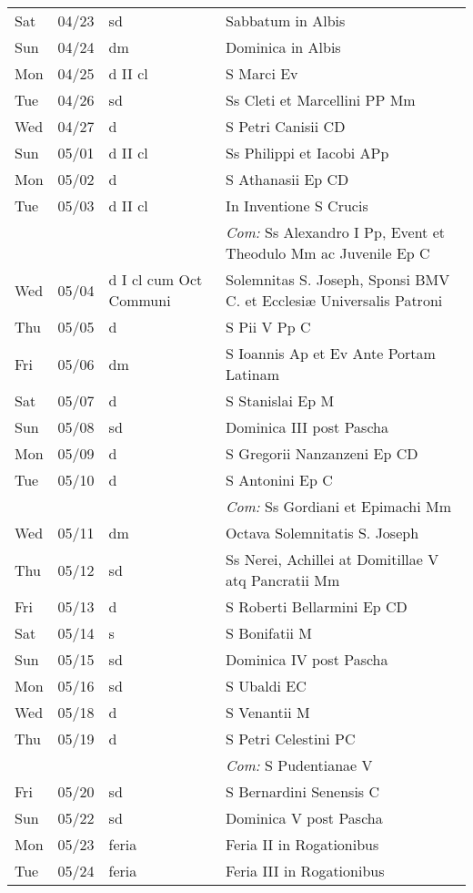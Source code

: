 \documentclass[10pt]{article}
\begin{document}
\begin{longtable}{ l l l l }
Sat & 04/23 & sd & Sabbatum in Albis\\
Sun & 04/24 & dm & Dominica in Albis\\
Mon & 04/25 & d II cl & S Marci Ev\\
Tue & 04/26 & sd & Ss Cleti et Marcellini PP Mm\\
Wed & 04/27 & d & S Petri Canisii CD\\
Sun & 05/01 & d II cl & Ss Philippi et Iacobi APp\\
Mon & 05/02 & d & S Athanasii Ep CD\\
Tue & 05/03 & d II cl & In Inventione S Crucis\\
 & & & \textit{Com:} Ss Alexandro I Pp, Event et Theodulo Mm ac Juvenile Ep C\\
Wed & 05/04 & d I cl cum Oct Communi & Solemnitas S. Joseph, Sponsi BMV C. et Ecclesiæ Universalis Patroni\\
Thu & 05/05 & d & S Pii V Pp C\\
Fri & 05/06 & dm & S Ioannis Ap et Ev Ante Portam Latinam\\
Sat & 05/07 & d & S Stanislai Ep M\\
Sun & 05/08 & sd & Dominica III post Pascha\\
Mon & 05/09 & d & S Gregorii Nanzanzeni Ep CD\\
Tue & 05/10 & d & S Antonini Ep C\\
 & & & \textit{Com:} Ss Gordiani et Epimachi Mm\\
Wed & 05/11 & dm & Octava Solemnitatis S. Joseph\\
Thu & 05/12 & sd & Ss Nerei, Achillei at Domitillae V atq Pancratii Mm\\
Fri & 05/13 & d & S Roberti Bellarmini Ep CD\\
Sat & 05/14 & s & S Bonifatii M\\
Sun & 05/15 & sd & Dominica IV post Pascha\\
Mon & 05/16 & sd & S Ubaldi EC\\
Wed & 05/18 & d & S Venantii M\\
Thu & 05/19 & d & S Petri Celestini PC\\
 & & & \textit{Com:} S Pudentianae V\\
Fri & 05/20 & sd & S Bernardini Senensis C\\
Sun & 05/22 & sd & Dominica V post Pascha\\
Mon & 05/23 & feria & Feria II in Rogationibus\\
Tue & 05/24 & feria & Feria III in Rogationibus\\

\end{longtable}
\end{document}
